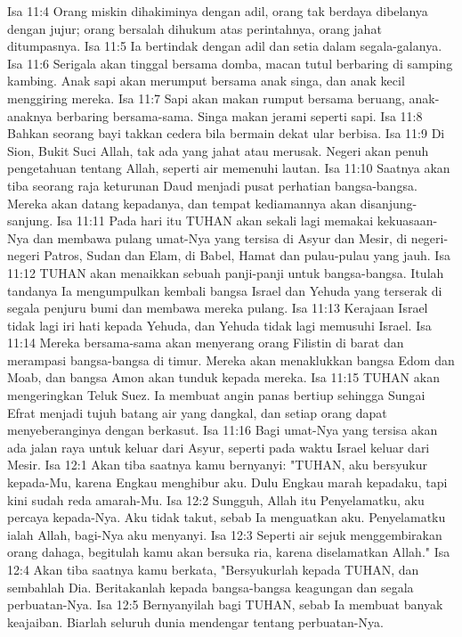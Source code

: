 Isa 11:4  Orang miskin dihakiminya dengan adil, orang tak berdaya dibelanya dengan jujur; orang bersalah dihukum atas perintahnya, orang jahat ditumpasnya.
Isa 11:5  Ia bertindak dengan adil dan setia dalam segala-galanya.
Isa 11:6  Serigala akan tinggal bersama domba, macan tutul berbaring di samping kambing. Anak sapi akan merumput bersama anak singa, dan anak kecil menggiring mereka.
Isa 11:7  Sapi akan makan rumput bersama beruang, anak-anaknya berbaring bersama-sama. Singa makan jerami seperti sapi.
Isa 11:8  Bahkan seorang bayi takkan cedera bila bermain dekat ular berbisa.
Isa 11:9  Di Sion, Bukit Suci Allah, tak ada yang jahat atau merusak. Negeri akan penuh pengetahuan tentang Allah, seperti air memenuhi lautan.
Isa 11:10  Saatnya akan tiba seorang raja keturunan Daud menjadi pusat perhatian bangsa-bangsa. Mereka akan datang kepadanya, dan tempat kediamannya akan disanjung-sanjung.
Isa 11:11  Pada hari itu TUHAN akan sekali lagi memakai kekuasaan-Nya dan membawa pulang umat-Nya yang tersisa di Asyur dan Mesir, di negeri-negeri Patros, Sudan dan Elam, di Babel, Hamat dan pulau-pulau yang jauh.
Isa 11:12  TUHAN akan menaikkan sebuah panji-panji untuk bangsa-bangsa. Itulah tandanya Ia mengumpulkan kembali bangsa Israel dan Yehuda yang terserak di segala penjuru bumi dan membawa mereka pulang.
Isa 11:13  Kerajaan Israel tidak lagi iri hati kepada Yehuda, dan Yehuda tidak lagi memusuhi Israel.
Isa 11:14  Mereka bersama-sama akan menyerang orang Filistin di barat dan merampasi bangsa-bangsa di timur. Mereka akan menaklukkan bangsa Edom dan Moab, dan bangsa Amon akan tunduk kepada mereka.
Isa 11:15  TUHAN akan mengeringkan Teluk Suez. Ia membuat angin panas bertiup sehingga Sungai Efrat menjadi tujuh batang air yang dangkal, dan setiap orang dapat menyeberanginya dengan berkasut.
Isa 11:16  Bagi umat-Nya yang tersisa akan ada jalan raya untuk keluar dari Asyur, seperti pada waktu Israel keluar dari Mesir.
Isa 12:1  Akan tiba saatnya kamu bernyanyi: "TUHAN, aku bersyukur kepada-Mu, karena Engkau menghibur aku. Dulu Engkau marah kepadaku, tapi kini sudah reda amarah-Mu.
Isa 12:2  Sungguh, Allah itu Penyelamatku, aku percaya kepada-Nya. Aku tidak takut, sebab Ia menguatkan aku. Penyelamatku ialah Allah, bagi-Nya aku menyanyi.
Isa 12:3  Seperti air sejuk menggembirakan orang dahaga, begitulah kamu akan bersuka ria, karena diselamatkan Allah."
Isa 12:4  Akan tiba saatnya kamu berkata, "Bersyukurlah kepada TUHAN, dan sembahlah Dia. Beritakanlah kepada bangsa-bangsa keagungan dan segala perbuatan-Nya.
Isa 12:5  Bernyanyilah bagi TUHAN, sebab Ia membuat banyak keajaiban. Biarlah seluruh dunia mendengar tentang perbuatan-Nya.
